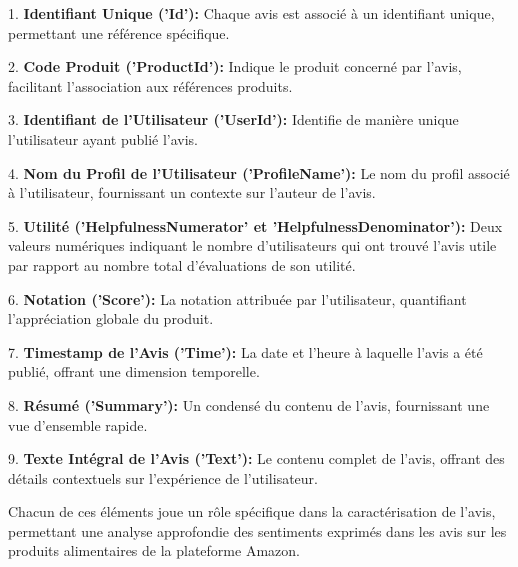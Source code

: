 1. \textbf{Identifiant Unique ('Id'):} Chaque avis est associé à un identifiant unique, permettant une référence spécifique.

2. \textbf{Code Produit ('ProductId'):} Indique le produit concerné par l'avis, facilitant l'association aux références produits.

3. \textbf{Identifiant de l'Utilisateur ('UserId'):} Identifie de manière unique l'utilisateur ayant publié l'avis.

4. \textbf{Nom du Profil de l'Utilisateur ('ProfileName'):} Le nom du profil associé à l'utilisateur, fournissant un contexte sur l'auteur de l'avis.

5. \textbf{Utilité ('HelpfulnessNumerator' et 'HelpfulnessDenominator'):} Deux valeurs numériques indiquant le nombre d'utilisateurs qui ont trouvé l'avis utile par rapport au nombre total d'évaluations de son utilité.

6. \textbf{Notation ('Score'):} La notation attribuée par l'utilisateur, quantifiant l'appréciation globale du produit.

7. \textbf{Timestamp de l'Avis ('Time'):} La date et l'heure à laquelle l'avis a été publié, offrant une dimension temporelle.

8. \textbf{Résumé ('Summary'):} Un condensé du contenu de l'avis, fournissant une vue d'ensemble rapide.

9. \textbf{Texte Intégral de l'Avis ('Text'):} Le contenu complet de l'avis, offrant des détails contextuels sur l'expérience de l'utilisateur.

Chacun de ces éléments joue un rôle spécifique dans la caractérisation de l'avis, permettant une analyse approfondie des sentiments exprimés dans les avis sur les produits alimentaires de la plateforme Amazon.

